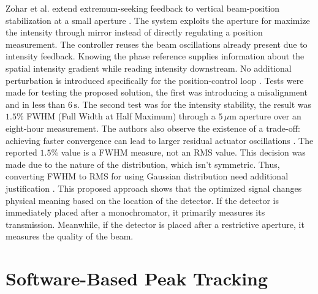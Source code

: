 Zohar et al. extend extremum-seeking feedback to vertical beam-position stabilization at a small aperture \cite{Zohar2016}. 
The system exploits the aperture for maximize the intensity through mirror instead of directly regulating a position measurement. 
The controller reuses the beam oscillations already present due to intensity feedback.
Knowing the phase reference supplies information about the spatial intensity gradient while reading intensity downstream.
No additional perturbation is introduced specifically for the position-control loop \cite{Zohar2016}.
Tests were made for testing the proposed solution, the first was introducing a misalignment and in less than $6\,\mathrm{s}$.
The second test was for the intensity stability, the result was  $1.5\%$ FWHM (Full Width at Half Maximum) through a $5\,\mu\mathrm{m}$ aperture over an eight-hour measurement.
The authors also observe the existence of a trade-off: achieving faster convergence can lead to larger residual actuator oscillations \cite{Zohar2016}.
The reported $1.5\%$ value is a FWHM measure, not an RMS value.
This decision was made due to the nature of the distribution, which isn't symmetric.
Thus, converting FWHM to RMS for using Gaussian distribution need additional justification \cite{Zohar2016}.
This proposed approach shows that the optimized signal changes physical meaning based on the location of the detector.
If the detector is immediately placed after a monochromator, it primarily measures its transmission. Meanwhile, if the detector is placed after a restrictive aperture, it measures the quality of the beam.

\section{Software-Based Peak Tracking}

